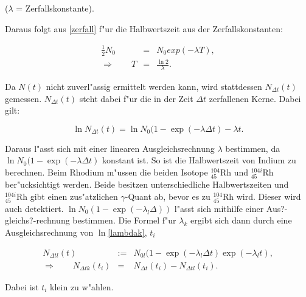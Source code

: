 		\begin{center}
				\tiny{($\lambda$ = Zerfallskonstante).}
		\end{center}

		Daraus folgt aus \eqref{zerfall} f"ur die Halbwertszeit aus der Zerfallskonstanten:

		\begin{eqnarray}
			\frac{1}{2} N_0 &=& N_0 exp{(-\lambda T)}, \nonumber \\
			\Rightarrow \qquad T &=& \frac{\ln{2}}{\lambda}.
			\label{eqn:t_halb}
		\end{eqnarray}

		Da $N(t)$ nicht zuverl"assig ermittelt werden kann, wird stattdessen $N_{\Delta t}(t)$ gemessen. 
		$N_{\Delta t}(t)$ steht dabei f"ur die in der Zeit $\Delta t$ zerfallenen Kerne.
		Dabei gilt:

		\begin{equation}
			\ln{N_{\Delta t}(t)} = \ln{N_0 (1 - \exp{(-\lambda \Delta t)}} - \lambda t.
		\end{equation}
		
		Daraus l"asst sich mit einer linearen Ausgleichsrechnung $\lambda$ bestimmen, da \\
		$\ln{N_0 (1 - \exp{(-\lambda \Delta t)}}$ konstant ist.
		So ist die Halbwertszeit von Indium zu berechnen.
		Beim Rhodium m"ussen die beiden Isotope $^{104}_{45}\mathrm{Rh}$ und $^{104i}_{45}\mathrm{Rh}$ ber"ucksichtigt werden.
		Beide besitzen unterschiedliche Halbwertszeiten und $^{104i}_{45}\mathrm{Rh}$ gibt einen zus"atzlichen $\gamma$-Quant ab, bevor es zu $^{104}_{45}\mathrm{Rh}$ wird.
		Dieser wird auch detektiert.
		$\ln{N_0 (1 - \exp{(-\lambda_l \Delta) })}$ l"asst sich mithilfe einer Aus?-gleichs?-rech\-nung bestimmen.
		Die Formel f"ur $\lambda_k$ ergibt sich dann durch eine Ausgleichsrechnung von {$\ln$\eqref{lambdak}, $t_i$}

		\begin{eqnarray}
			N_{\Delta tl}(t) &:=& N_{0l} (1-\exp{(-\lambda_l \Delta t)}\exp{(-\lambda_l t)},\nonumber\\
			\Rightarrow \qquad N_{\Delta tk}(t_i) &=& N_{\Delta t}(t_i) - N_{\Delta tl}(t_i). \label{lambdak}
		\end{eqnarray}

		Dabei ist $t_i$ klein zu w"ahlen.